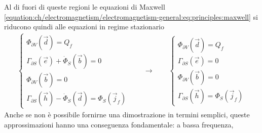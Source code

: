 \documentclass[letterpaper,10pt,italian]{jupyterBook}
\begin{document}
\sphinxAtStartPar
Al di fuori di queste regioni le equazioni di Maxwell \eqref{equation:ch/electromagnetism/electromagnetism-general:eq:principles:maxwell} si riducono quindi alle equazioni in regime stazionario
\begin{equation}\label{equation:ch/electromagnetism/circuits-electric:eq:principles:maxwell:el-circuit}
\begin{split}\begin{cases}
  \Phi_{\partial V}(\vec{d}) = Q_f \\
  \Gamma_{\partial S}(\vec{e}) + \dot{\Phi}_S(\vec{b}) = 0 \\
  \Phi_{\partial V}(\vec{b}) = 0 \\
  \Gamma_{\partial S}(\vec{h}) - \dot{\Phi}_S(\vec{d}) = \Phi_S(\vec{j}_f)
\end{cases}
\qquad \rightarrow \qquad
\begin{cases}
  \Phi_{\partial V}(\vec{d}) = Q_f \\
  \Gamma_{\partial S}(\vec{e}) = 0 \\
  \Phi_{\partial V}(\vec{b}) = 0 \\
  \Gamma_{\partial S}(\vec{h}) = \Phi_S(\vec{j}_f)
\end{cases}\end{split}
\end{equation}
\sphinxAtStartPar
Anche se non è possibile fornirne una dimostrazione in termini semplici, queste approssimazioni hanno una conseguenza fondamentale: a bassa frequenza,
\end{document}
